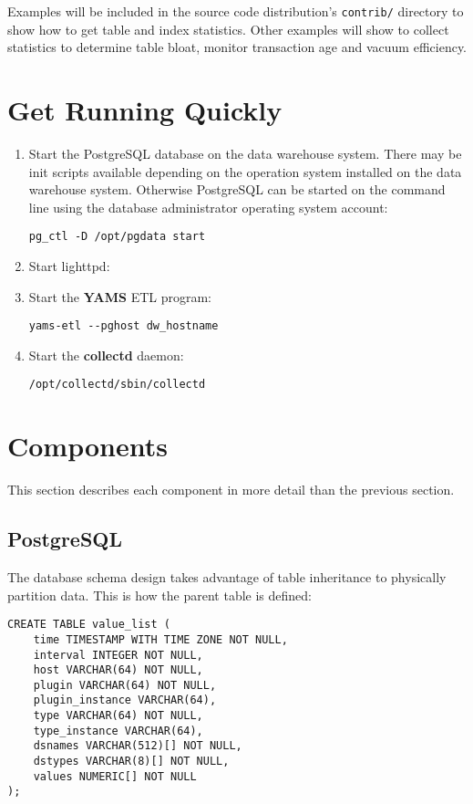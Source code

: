 \documentclass[a4paper,twoside,12pt]{article}
\begin{document}
Examples will be included in the source code distribution's \texttt{contrib/}
directory to show how to get table and index statistics.  Other examples will
show to collect statistics to determine table bloat, monitor transaction age
and vacuum efficiency.

\section{Get Running Quickly}

\begin{enumerate}
  \item Start the PostgreSQL database on the data warehouse system.  There may
        be init scripts available depending on the operation system installed
        on the data warehouse system.  Otherwise PostgreSQL can be started on
        the command line using the database administrator operating system
        account:
        \lstset{language=sh}
        \begin{lstlisting}
pg_ctl -D /opt/pgdata start
        \end{lstlisting}
  \item Start lighttpd:
  \item Start the \textbf{YAMS} ETL program:
        \lstset{language=sh}
        \begin{lstlisting}
yams-etl --pghost dw_hostname
        \end{lstlisting}
  \item Start the \textbf{collectd} daemon:
        \lstset{language=sh}
        \begin{lstlisting}
/opt/collectd/sbin/collectd
        \end{lstlisting}
\end{enumerate}

\section{Components}

This section describes each component in more detail than the previous section.

\subsection{PostgreSQL}

The database schema design takes advantage of table inheritance to physically
partition data.  This is how the parent table is defined:
\lstset{language=sql}
\begin{lstlisting}
CREATE TABLE value_list (
    time TIMESTAMP WITH TIME ZONE NOT NULL,
    interval INTEGER NOT NULL,
    host VARCHAR(64) NOT NULL,
    plugin VARCHAR(64) NOT NULL,
    plugin_instance VARCHAR(64),
    type VARCHAR(64) NOT NULL,
    type_instance VARCHAR(64),
    dsnames VARCHAR(512)[] NOT NULL,
    dstypes VARCHAR(8)[] NOT NULL,
    values NUMERIC[] NOT NULL
);
\end{lstlisting}
\end{document}
